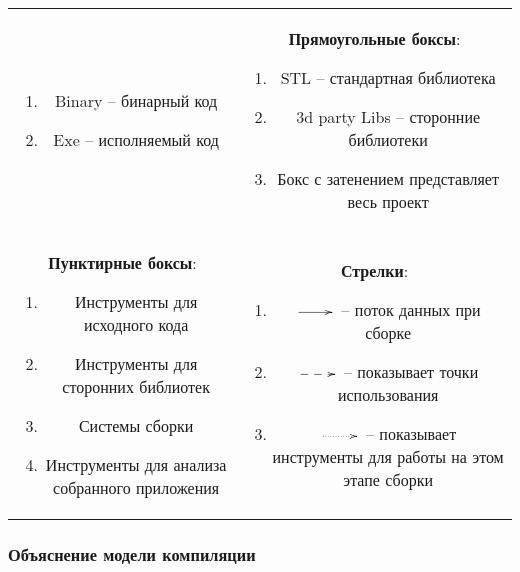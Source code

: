 \begin{center}
\begin{tabular}{cc}
{\begin{minipage}[t]{8cm}
\begin{enumerate}
\item Binary -- бинарный код

\item Exe -- исполняемый код
\end{enumerate}
\end{minipage}
}&{
\begin{minipage}[t]{8cm}
\textbf{Прямоугольные боксы}:
\begin{enumerate}
\item STL -- стандартная библиотека

\item 3d party Libs -- сторонние библиотеки

\item Бокс с затенением представляет весь проект 
\end{enumerate}
\end{minipage}
}\\
{
\begin{minipage}[t]{8cm}
\textbf{Пунктирные боксы}:
\begin{enumerate}
\item Инструменты для исходного кода

\item Инструменты для сторонних библиотек

\item Системы сборки

\item Инструменты для анализа собранного приложения
\end{enumerate}
\end{minipage}
}&{
\begin{minipage}[t]{8cm}
\textbf{Стрелки}:
\begin{enumerate}
\item $\xymatrix@1{{}\ar@{->}[r]&{}}$ -- поток данных при сборке

\item $\xymatrix@1{{}\ar@{-->}[r]&{}}$ -- показывает точки использования

\item $\xymatrix@1{{}\ar@{..>}[r]&{}}$ -- показывает инструменты для работы на этом этапе сборки
\end{enumerate}
\end{minipage}
}
\end{tabular}
\end{center}

\subsubsection{Объяснение модели компиляции}

